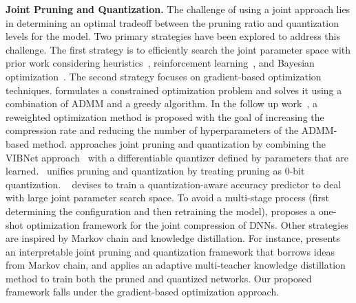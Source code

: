 
\smallskip
\noindent \textbf{Joint Pruning and Quantization.} The challenge of using a joint approach lies in determining an optimal tradeoff between the pruning ratio and quantization levels for the model. Two primary strategies have been explored to address this challenge. The first strategy is to efficiently search the joint parameter space with prior work considering heuristics~\cite{QST}, reinforcement learning~\cite{balaskas2024hardware}, and Bayesian optimization~\cite{Clip-q}. The second strategy focuses on gradient-based optimization techniques. \cite{yang2020automatic} formulates a constrained optimization problem and solves it using a combination of ADMM and a greedy algorithm. In the follow up work~\cite{admm}, a reweighted optimization method is proposed with the goal of increasing the compression rate and reducing the number of hyperparameters of the ADMM-based method. \cite{DJPQ} approaches joint pruning and quantization by combining the VIBNet approach~\cite{dai2018compressing} with a differentiable quantizer defined by parameters that are learned.~\cite{van2020bayesian} unifies pruning and quantization by treating pruning as 0-bit quantization. ~\cite{wang2020apq} devises to train a quantization-aware accuracy predictor to deal with large joint parameter search space. 
To avoid a multi-stage process (first determining the configuration and then retraining the model), \cite{opq} proposes a one-shot optimization framework for the joint compression of DNNs. Other strategies are inspired by Markov chain and knowledge distillation. For instance, \cite{li2024markov} presents an interpretable joint pruning and quantization framework that borrows ideas from Markov chain, and \cite{li2024adaptive} applies an adaptive multi-teacher knowledge distillation method to train both the pruned and quantized networks. Our proposed framework falls under the gradient-based optimization approach.

